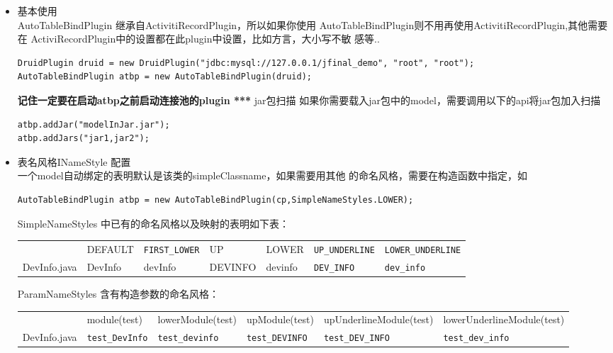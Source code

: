 \documentclass{scrartcl}
\begin{document}
\begin{itemize}

\item 基本使用\\
\label{sec-2-1-2-1}%
AutoTableBindPlugin 继承自ActivitiRecordPlugin，所以如果你使用
      AutoTableBindPlugin则不用再使用ActivitiRecordPlugin,其他需要在
      ActiviRecordPlugin中的设置都在此plugin中设置，比如方言，大小写不敏
      感等..

\begin{verbatim}
DruidPlugin druid = new DruidPlugin("jdbc:mysql://127.0.0.1/jfinal_demo", "root", "root");
AutoTableBindPlugin atbp = new AutoTableBindPlugin(druid);
\end{verbatim}
   
  \textbf{记住一定要在启动atbp之前启动连接池的plugin ***}  jar包扫描 
      如果你需要载入jar包中的model，需要调用以下的api将jar包加入扫描

\begin{verbatim}
atbp.addJar("modelInJar.jar");
atbp.addJars("jar1,jar2");
\end{verbatim}


\item 表名风格INameStyle 配置\\
\label{sec-2-1-2-3}%
一个model自动绑定的表明默认是该类的simpleClassname，如果需要用其他
   的命名风格，需要在构造函数中指定，如

\begin{verbatim}
AutoTableBindPlugin atbp = new AutoTableBindPlugin(cp,SimpleNameStyles.LOWER);
\end{verbatim}
   
   SimpleNameStyles 中已有的命名风格以及映射的表明如下表：


\begin{tabular}{lllllll}
               &  DEFAULT  &  \texttt{FIRST\_LOWER}  &  UP       &  LOWER    &  \texttt{UP\_UNDERLINE}  &  \texttt{LOWER\_UNDERLINE}  \\
 DevInfo.java  &  DevInfo  &  devInfo                &  DEVINFO  &  devinfo  &  \texttt{DEV\_INFO}      &  \texttt{dev\_info}         \\
\end{tabular}


  
   ParamNameStyles 含有构造参数的命名风格：

\begin{tabular}{llllll}
               &  module(test)            &  lowerModule(test)       &  upModule(test)          &  upUnderlineModule(test)   &  lowerUnderlineModule(test)  \\
 DevInfo.java  &  \texttt{test\_DevInfo}  &  \texttt{test\_devinfo}  &  \texttt{test\_DEVINFO}  &  \texttt{test\_DEV\_INFO}  &  \texttt{test\_dev\_info}    \\
\end{tabular}



\end{itemize}
\end{document}
